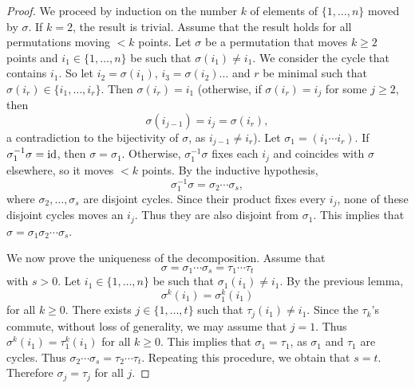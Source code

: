 \begin{proof}
    We proceed by induction on the number $k$ 
    of elements of $\{1,\dots,n\}$ moved by $\sigma$. If $k=2$, 
    the result is trivial. Assume that the result 
    holds for all permutations moving $<k$ points. Let
    $\sigma$ be a permutation that moves $k\geq2$ points and 
    $i_1\in\{1,\dots,n\}$ be such that $\sigma(i_1)\ne i_1$. We 
    consider the cycle that contains $i_1$. So let 
        $i_2=\sigma(i_1)$, $i_3=\sigma(i_2)$... 
        and $r$ be minimal such that
        $\sigma(i_r)\in\{i_1,\dots,i_r\}$.
        Then $\sigma(i_r)=i_1$
        (otherwise, if $\sigma(i_r)=i_j$ for some 
        $j\geq2$, then 
        \[
        \sigma(i_{j-1})=i_j=\sigma(i_r),
        \]
        a contradiction to the bijectivity of $\sigma$, as $i_{j-1}\ne i_r$). 
        Let $\sigma_1=(i_1\cdots i_r)$. 
        If $\sigma_1^{-1}\sigma=\operatorname{id}$, then $\sigma=\sigma_1$.
        Otherwise, $\sigma_1^{-1}\sigma$ fixes each $i_j$ and
        coincides with $\sigma$ elsewhere, so it moves $<k$ points.
        By the inductive hypothesis,  
        \[
        \sigma_1^{-1}\sigma=\sigma_2\cdots\sigma_s,
        \]
        where 
        $\sigma_2,\dots,\sigma_s$ are disjoint cycles. Since their product fixes every $i_j$, none of these
        disjoint cycles moves an $i_j$. Thus they are also
        disjoint from $\sigma_1$.
        This implies that $\sigma=\sigma_1\sigma_2\cdots\sigma_s$.

        We now prove the uniqueness of the decomposition. 
        Assume that 
        \[
        \sigma=\sigma_1\cdots\sigma_s=\tau_1\cdots\tau
_t
\]
with $s>0$. Let $i_1\in\{1,\dots,n\}$ be such that 
        $\sigma_1(i_1)\ne i_1$. By the previous lemma, 
        \[
        \sigma^k(i_1)=\sigma_1^k(i_1)
        \]
        for all $k\geq0$.
        There exists $j\in\{1,\dots,t\}$ such that 
        $\tau_j(i_1)\ne i_1$. Since the $\tau_k$'s commute, 
        without loss of generality, we may assume that $j=
1$. Thus $\sigma^k(i_1)=\tau_1^k(i_1)$ for all $k\geq0$.  
This implies that 
        $\sigma_1=\tau_1$, as $\sigma_1$ and $\tau_1$ are cycles. 
        Thus $\sigma_2\cdots\sigma_s=\tau_2\cdots\tau_t$. Repeating
        this procedure, we obtain that $s=t$. Therefore 
        $\sigma_j=\tau_j$ for all $j$.
\end{proof}

